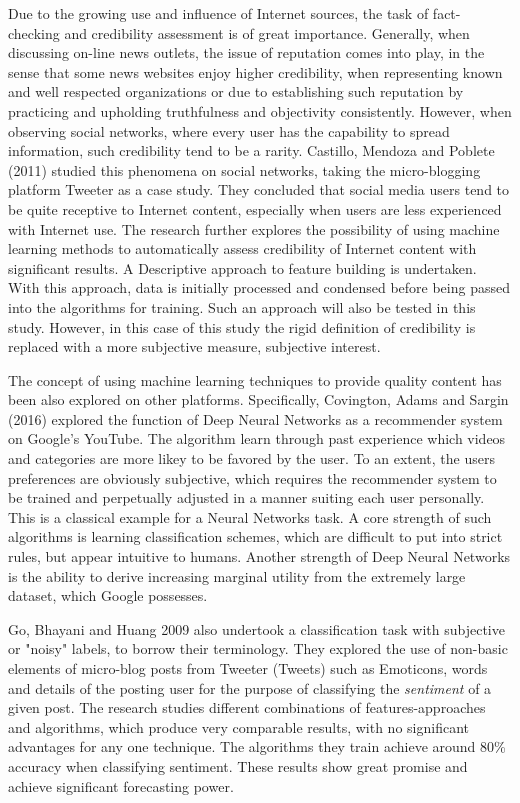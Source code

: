 		Due to the growing use and influence of Internet sources, the task of fact-checking and credibility assessment is of great importance. Generally, when discussing on-line news outlets, the issue of reputation comes into play, in the sense that some news websites enjoy higher credibility, when representing known and well respected organizations or due to establishing such reputation by practicing and upholding truthfulness and objectivity consistently. However, when observing social networks, where every user has the capability to spread information, such credibility tend to be a rarity. Castillo, Mendoza and Poblete (2011) \cite{castillo2011information} studied this phenomena on social networks, taking the micro-blogging platform Tweeter as a case study. They concluded that social media users tend to be quite receptive to Internet content, especially when users are less experienced with Internet use. The research further explores the possibility of using machine learning methods to automatically assess credibility of Internet content with significant results. A Descriptive approach to feature building is undertaken. With this approach, data is initially processed and condensed before being passed into the algorithms for training. Such an approach will also be tested in this study. However, in this case of this study the rigid definition of credibility is replaced with a more subjective measure, subjective interest.
		
		\par
		
		The concept of using machine learning techniques to provide quality content has been also explored on other platforms. Specifically, Covington, Adams and Sargin (2016) \cite{covington2016deep} explored the function of Deep Neural Networks as a recommender system on Google's YouTube. The algorithm learn through past experience which videos and categories are more likey to be favored by the user. To an extent, the users preferences are obviously subjective, which requires the recommender system to be trained and perpetually adjusted in a manner suiting each user personally. This is a classical example for a Neural Networks task. A core strength of such algorithms is learning classification schemes, which are difficult to put into strict rules, but appear intuitive to humans. Another strength of Deep Neural Networks is the ability to derive increasing marginal utility from the extremely large dataset, which Google possesses.
		
		\par
		
		Go, Bhayani and Huang 2009 \cite{go2009twitter} also undertook a classification task with subjective or "noisy" labels, to borrow their terminology. They explored the use of non-basic elements of micro-blog posts from Tweeter (Tweets) such as Emoticons, words and details of the posting user for the purpose of classifying the \textit{sentiment} of a given post. The research studies different combinations of features-approaches and algorithms, which produce very comparable results, with no significant advantages for any one technique. The algorithms they train achieve around 80\% accuracy when classifying sentiment. These results show great promise and achieve significant forecasting power.
	